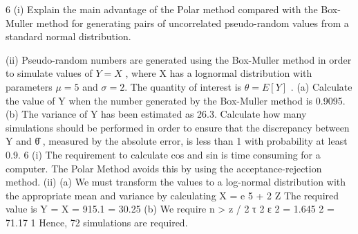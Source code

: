\documentclass[a4paper,12pt]{article}
\begin{document}
6
(i) Explain the main advantage of the Polar method compared with the Box-Muller method for generating pairs of uncorrelated pseudo-random values from a standard normal distribution.

(ii) Pseudo-random numbers are generated using the Box-Muller method in order to simulate values of $Y = X$ , where X has a lognormal distribution with parameters $\mu = 5$ and $\sigma = 2$. The quantity of interest is $\theta = E [ Y ]$ .
(a) Calculate the value of Y when the number generated by the Box-Muller method is 0.9095.
(b) The variance of Y has been estimated as 26.3. Calculate how many simulations should be performed in order to ensure that the
discrepancy between Y and θ̂ , measured by the absolute error, is less than 1 with probability at least 0.9.
\newpage
6
(i) The requirement to calculate cos and sin is time consuming for a computer.
The Polar Method avoids this by using the acceptance-rejection method.
(ii) (a)
We must transform the values to a log-normal distribution with the
appropriate mean and variance by calculating
X = e 5 + 2 Z
The required value is Y = X = 915.1 = 30.25
(b)
We require n >
z  / 2 τ 2
ε 2
=
1.645 2 
= 71.17
1
Hence, 72 simulations are required.

\newpage
\end{document}
